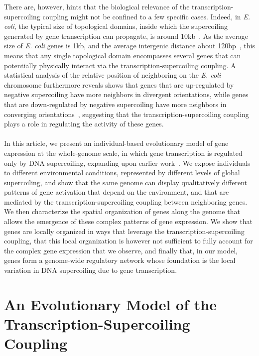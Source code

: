 There are, however, hints that the biological relevance of the transcription-supercoiling coupling might not be confined to a few specific cases.
Indeed, in \emph{E. coli}, the typical size of topological domains, inside which the supercoiling generated by gene transcription can propagate, is around 10kb~\citep{postow2004}.
As the average size of \emph{E. coli} genes is 1kb, and the average intergenic distance about 120bp~\citep{blattner1997}, this means that any single topological domain encompasses several genes that can potentially physically interact via the transcription-supercoiling coupling.
A statistical analysis of the relative position of neighboring on the \emph{E. coli} chromosome furthermore reveals shows that genes that are up-regulated by negative supercoiling have more neighbors in divergent orientations, while genes that are down-regulated by negative supercoiling have more neighbors in converging orientations~\citep{sobetzko2016}, suggesting that the transcription-supercoiling coupling plays a role in regulating the activity of these genes.

\paragraph{}
In this article, we present an individual-based evolutionary model of gene expression at the whole-genome scale, in which gene transcription is regulated only by DNA supercoiling, expanding upon earlier work~\citep{grohens2021}.
We expose individuals to different environmental conditions, represented by different levels of global supercoiling, and show that the same genome can display qualitatively different patterns of gene activation that depend on the environment, and that are mediated by the transcription-supercoiling coupling between neighboring genes.
We then characterize the spatial organization of genes along the genome that allows the emergence of these complex patterns of gene expression.
We show that genes are locally organized in ways that leverage the transcription-supercoiling coupling, that this local organization is however not sufficient to fully account for the complex gene expression that we observe, and finally that, in our model, genes form a genome-wide regulatory network whose foundation is the local variation in DNA supercoiling due to gene transcription.


\section{An Evolutionary Model of the Transcription-Supercoiling Coupling}
\label{sec:model}

